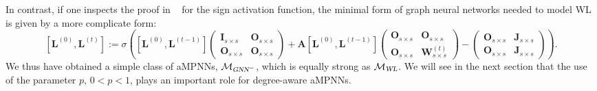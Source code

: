 In contrast, if one inspects the proof in
~\cite{grohewl} for the sign activation function, the minimal form of graph neural networks needed to model WL is given by a more complicate form:
$$
[\mathbf{L}^{(0)},\mathbf{L}^{(t)}]:=\sigma\left([\mathbf{L}^{(0)},\mathbf{L}^{(t-1)}]\begin{pmatrix}
\mathbf{I}_{s\times s} & \mathbf{O}_{s\times s}\\
\mathbf{O}_{s\times s} & \mathbf{O}_{s\times s}\end{pmatrix}
+\mathbf{A}[\mathbf{L}^{(0)},\mathbf{L}^{(t-1)}]
\begin{pmatrix}
\mathbf{O}_{s\times s} & \mathbf{O}_{s\times s}\\
\mathbf{O}_{s\times s} & \mathbf{W}_{s\times s}^{(t)}\end{pmatrix}-
\begin{pmatrix}
\mathbf{O}_{s\times s} & \mathbf{J}_{s\times s}\\
\mathbf{O}_{s\times s} & \mathbf{J}_{s\times s}\end{pmatrix}
\right).
$$
We thus have obtained a simple class of aMPNNs, $\mathcal{M}_{\textsl{GNN}^-}$, which is equally strong as $\mathcal{M}_{\textsl{WL}}$. We will see in the next section that the use of the parameter $p$, $0<p<1$, plays an important role for degree-aware aMPNNs.
